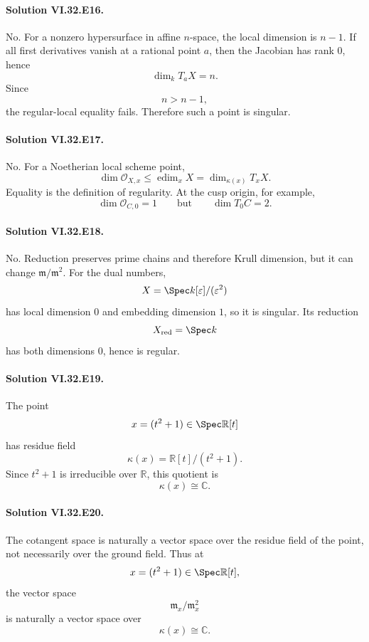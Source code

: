 \paragraph{Solution VI.32.E16.}
No.  For a nonzero hypersurface in affine \(n\)-space, the local dimension is \(n-1\).  If all first derivatives
vanish at a rational point \(a\), then the Jacobian has rank \(0\), hence
\[
\dim_kT_aX=n.
\]
Since
\[
n>n-1,
\]
the regular-local equality fails. Therefore such a point is singular.

\paragraph{Solution VI.32.E17.}
No.  For a Noetherian local scheme point,
\[
\dim\mathcal O_{X,x}
\le
\operatorname{edim}_xX
=
\dim_{\kappa(x)}T_xX.
\]
Equality is the definition of regularity.  At the cusp origin, for example,
\[
\dim\mathcal O_{C,0}=1
\qquad\text{but}\qquad
\dim T_0C=2.
\]

\paragraph{Solution VI.32.E18.}
No.  Reduction preserves prime chains and therefore Krull dimension, but it can change
\(\mathfrak m/\mathfrak m^2\).  For the dual numbers,
\[
X=\Spec k[\varepsilon]/(\varepsilon^2)
\]
has local dimension \(0\) and embedding dimension \(1\), so it is singular.  Its reduction
\[
X_{\mathrm{red}}=\Spec k
\]
has both dimensions \(0\), hence is regular.

\paragraph{Solution VI.32.E19.}
The point
\[
x=(t^2+1)\in\Spec\mathbb R[t]
\]
has residue field
\[
\kappa(x)
=
\mathbb R[t]/(t^2+1).
\]
Since \(t^2+1\) is irreducible over \(\mathbb R\), this quotient is
\[
\boxed{\kappa(x)\cong\mathbb C}.
\]

\paragraph{Solution VI.32.E20.}
The cotangent space is naturally a vector space over the residue field of the point, not necessarily over the
ground field.  Thus at
\[
x=(t^2+1)\in\Spec\mathbb R[t],
\]
the vector space
\[
\mathfrak m_x/\mathfrak m_x^2
\]
is naturally a vector space over
\[
\boxed{\kappa(x)\cong\mathbb C}.
\]

